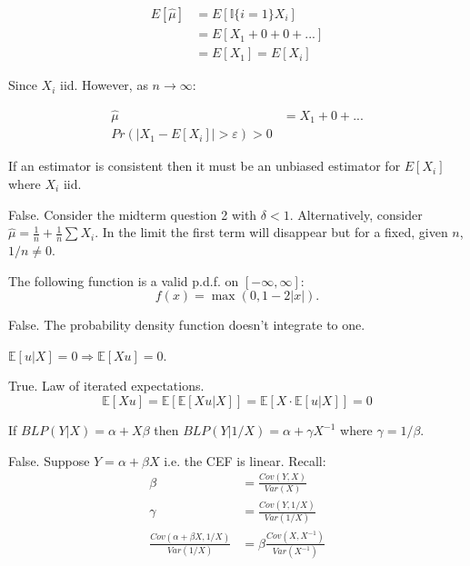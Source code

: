 \documentclass{exam}
\begin{document}
\begin{questions}
\begin{solution}
        \begin{align*}
            E[\hat{\mu}] &= E[\mathbb{I}\{i = 1\}X_i]  \\
            &= E[X_1 + 0 + 0 + ...] \\
            &= E[X_1] = E[X_i]
        \end{align*}

        Since $X_i$ iid. However, as $n \rightarrow \infty$:

        \begin{align*}
            \hat{\mu} &= X_1 + 0 + ... \\
            Pr(|X_1 - E[X_i]| > \varepsilon) > 0
        \end{align*}
    \end{solution}


    \question If an estimator is consistent then it must be an unbiased estimator 
    for $E[X_i]$ where $X_i$ iid.


    \begin{solution}
    False. Consider the midterm question 2 with $\delta < 1$. Alternatively,
    consider $\hat{\mu} = \frac{1}{n} + \frac{1}{n} \sum X_i$. In the limit the 
    first term will disappear but for a fixed, given $n$, $1/n \neq 0$. 



    \end{solution}


	\question The following function is a valid p.d.f. on $[-\infty, \infty]$:
		\[    f(x) = \max(0, 1 - 2 |x| ). \]

		\begin{solution}
		    False. The probability density function doesn't integrate to one.
		\end{solution}



    \question
    $\mathbb{E}[u|X] {=} 0 \Rightarrow \mathbb{E}[Xu] {=} 0$.
    \begin{solution}
    True. Law of iterated expectations. $$\mathbb{E}[X u] = \mathbb{E}[\mathbb{E}[X u|X]] = \mathbb{E}[X \cdot \mathbb{E}[u|X]] = 0$$
    \end{solution}

    \question If $BLP(Y | X) = \alpha + X \beta$ then $BLP(Y | 1/X) = \alpha +  \gamma X^{-1}$ where 
    $\gamma = 1/\beta$.
\begin{solution}
    
    False. Suppose $Y = \alpha + \beta X$ i.e. the CEF is linear.
    Recall:
    \begin{align*}
        \beta &= \frac{Cov(Y, X)}{Var(X)} \\
        \gamma &= \frac{Cov(Y, 1/X)}{Var(1/X)} \\
        \frac{Cov(\alpha + \beta X, 1/X)}{Var(1/X)} &= \beta \frac{Cov(X, X^{-1})}{Var(X^{-1})} \\
    \end{align*}



\end{solution}
\end{questions}
\end{document}
